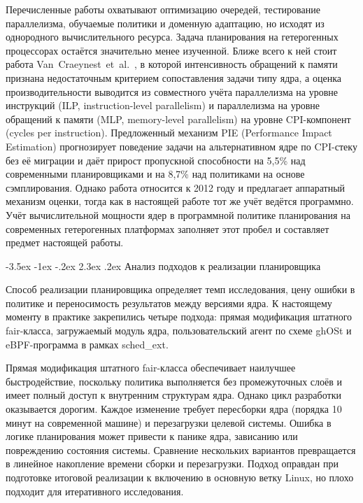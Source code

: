 \documentclass[14pt, oneside]{extbook}
\makeatletter
\renewcommand\section{\@startsection {section}{1}{\z@}%
                                   {-3.5ex \@plus -1ex \@minus -.2ex}%
                                   {2.3ex \@plus.2ex}%
                                   {\normalfont\fontsize{16}{20}\selectfont\bfseries}}
\makeatother
\begin{document}
        \begin{sloppypar}
        Перечисленные работы охватывают оптимизацию очередей,
        тестирование параллелизма, обучаемые политики и доменную
        адаптацию, но исходят из однородного вычислительного ресурса.
        Задача планирования на гетерогенных процессорах остаётся
        значительно менее изученной. Ближе всего
        к ней стоит работа Van~Craeynest~et~al.~\cite{pie}, в которой
        интенсивность обращений к памяти признана недостаточным
        критерием сопоставления задачи типу ядра, а оценка
        производительности выводится из совместного учёта параллелизма
        на уровне инструкций (ILP, instruction-level parallelism)
        и параллелизма на уровне обращений к памяти
        (MLP, memory-level parallelism)
        на уровне CPI-компонент (cycles per instruction). Предложенный механизм PIE
        (Performance Impact Estimation) прогнозирует
        поведение задачи на альтернативном ядре по CPI-стеку без
        её миграции и даёт прирост пропускной способности на 5,5\%
        над современными планировщиками и на 8,7\% над политиками
        на основе сэмплирования. Однако
        работа относится к 2012 году и предлагает аппаратный механизм
        оценки, тогда как в настоящей работе тот же учёт ведётся
        программно.
        Учёт вычислительной мощности ядер в программной политике
        планирования на современных гетерогенных платформах
        заполняет этот пробел и составляет предмет настоящей работы.
        \end{sloppypar}


\section{Анализ подходов к реализации планировщика}

        Способ реализации планировщика определяет темп
        исследования, цену ошибки в политике и переносимость
        результатов между версиями ядра. К настоящему моменту в
        практике закрепились четыре подхода: прямая модификация
        штатного fair-класса, загружаемый модуль ядра, пользовательский
        агент по схеме ghOSt и eBPF-программа в рамках sched\_ext.

        Прямая модификация штатного fair-класса обеспечивает
        наилучшее быстродействие, поскольку политика выполняется
        без промежуточных слоёв и имеет полный доступ к внутренним
        структурам ядра. Однако цикл разработки оказывается
        дорогим. Каждое изменение требует пересборки ядра
        (порядка 10 минут на современной машине) и перезагрузки
        целевой системы. Ошибка в логике планирования может
        привести к панике ядра, зависанию или повреждению
        состояния системы. Сравнение нескольких вариантов
        превращается в линейное накопление времени сборки и
        перезагрузки. Подход оправдан при подготовке итоговой
        реализации к включению в основную ветку Linux, но плохо
        подходит для итеративного исследования.
\end{document}
